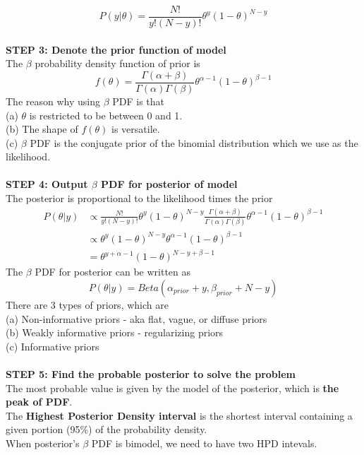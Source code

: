 \documentclass{article}
\begin{document}
\begin{enumerate}[S1 - ]
    \begin{equation*}
    P(y|\theta) = \frac{N!}{y!(N-y)!}\theta^{y}(1-\theta)^{N-y}
    \end{equation*}
    \\
    \textbf{STEP 3: Denote the prior function of model}\\
    The $\beta$ probability density function of prior is
    \begin{equation*}
    f(\theta) = \frac{\Gamma(\alpha+\beta)}{\Gamma(\alpha)\Gamma(\beta)}\theta^{\alpha-1}(1-\theta)^{\beta-1}
    \end{equation*}
    The reason why using $\beta$ PDF is that\\
    (a) $\theta$ is restricted to be between 0 and 1.\\
    (b) The shape of $f(\theta)$ is versatile.\\
    (c) $\beta$ PDF is the conjugate prior of the binomial distribution which we use as the likelihood.\\
    \\
    \textbf{STEP 4: Output $\beta$ PDF for posterior of model}\\
    The posterior is proportional to the likelihood times the prior
    \begin{equation*}
    \begin{split}
    P(\theta|y) & \propto \frac{N!}{y!(N-y)!}\theta^{y}(1-\theta)^{N-y}\frac{\Gamma(\alpha+\beta)}{\Gamma(\alpha)\Gamma(\beta)}\theta^{\alpha-1}(1-\theta)^{\beta-1}\\
    & \propto \theta^{y}(1-\theta)^{N-y}\theta^{\alpha-1}(1-\theta)^{\beta-1}\\
    & = \theta^{y+\alpha-1}(1-\theta)^{N-y+\beta-1}
    \end{split}
    \end{equation*}
    The $\beta$ PDF for posterior can be written as
    \begin{equation*}
    P(\theta|y) = Beta(\alpha_{prior}+y,\beta_{prior}+N-y)
    \end{equation*}
    There are 3 types of priors, which are\\
    (a) Non-informative priors - aka flat, vague, or diffuse priors\\
    (b) Weakly informative priors - regularizing priors\\
    (c) Informative priors \\
    \\
    \textbf{STEP 5: Find the probable posterior to solve the problem}\\
    The most probable value is given by the model of the posterior, which is \textbf{the peak of PDF}.\\
    The \textbf{Highest Posterior Density interval} is the shortest interval containing a given portion (95\%) of the probability density.\\
    When posterior's $\beta$ PDF is bimodel, we need to have two HPD intevals.\\
    

\end{enumerate}
\end{document}
